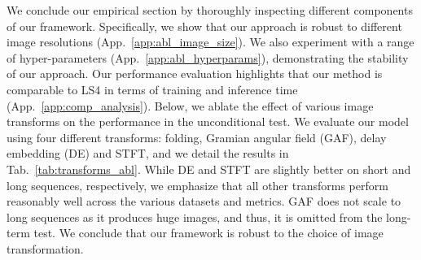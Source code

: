 \documentclass{article}
\begin{document}
We conclude our empirical section by thoroughly inspecting different components of our framework. Specifically, we show that our approach is robust to different image resolutions (App.~\ref{app:abl_image_size}). We also experiment with a range of hyper-parameters (App.~\ref{app:abl_hyperparams}), demonstrating the stability of our approach. Our performance evaluation highlights that our method is comparable to LS4 in terms of training and inference time (App.~\ref{app:comp_analysis}). Below, we ablate the effect of various image transforms on the performance in the unconditional test. We evaluate our model using four different transforms: folding, Gramian angular field (GAF), delay embedding (DE) and STFT, and we detail the results in Tab.~\ref{tab:transforms_abl}. While DE and STFT are slightly better on short and long sequences, respectively, we emphasize that all other transforms perform reasonably well across the various datasets and metrics. GAF does not scale to long sequences as it produces huge images, and thus, it is omitted from the long-term test. We conclude that our framework is robust to the choice of image transformation.


\begin{table}[!ht]
    \vspace{-3mm}
    \centering
    \caption{Short- and long-term ablation of various image transforms using several datasets and metrics.}
    \label{tab:transforms_abl}
    \vspace{-3mm}
\end{table}
\end{document}
